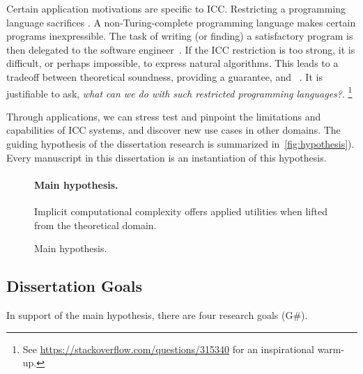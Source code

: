 Certain application motivations are specific to ICC\@.
Restricting a programming language sacrifices .
A non-Turing-complete programming language makes certain programs inexpressible.
The task of writing (or finding) a satisfactory program is then delegated to the software engineer~\cite[p. 14]{moyen2017}.
If the ICC restriction is too strong, it is difficult, or perhaps impossible, to express natural algorithms.
This leads to a tradeoff between theoretical soundness, \ie providing a guarantee, and ~\cite{feree2018}.
It is justifiable to ask, \emph{what can we do with such restricted programming languages?}.%
\footnote{See \url{https://stackoverflow.com/questions/315340} for an inspirational warm-up.}

Through applications, we can stress test and pinpoint the limitations and capabilities of ICC systems, and discover new use cases in other domains.
The guiding hypothesis of the dissertation research is summarized in~\autoref{fig:hypothesis}). Every manuscript in this dissertation is an instantiation of this hypothesis.

\begin{figure}[h]
\begin{mdframed}
\paragraph*{Main hypothesis.}
Implicit computational complexity offers applied utilities when lifted from the
theoretical domain.
\end{mdframed}
\caption[Main hypothesis summarized]{Main hypothesis.}
\label{fig:hypothesis}
\end{figure}

\subsection{Dissertation Goals}\label{subsec:specific-aims}

In support of the main hypothesis, there are four research goals (G\#).

